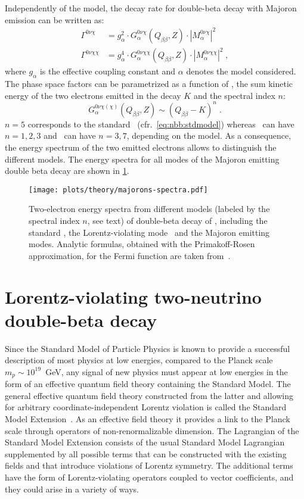 Independently of the model, the decay rate for double-beta decay with Majoron
emission can be written as:
\begin{align*}
  \Gamma^{0\nu\chi}  &= g_\alpha^2 \cdot G_\alpha^{0\nu\chi}(Q_{\beta\beta}, Z)
    \cdot |M_\alpha^{0\nu\chi}|^2 \\
  \Gamma^{0\nu\chi\chi} &= g_\alpha^4 \cdot G_\alpha^{0\nu\chi\chi}(Q_{\beta\beta}, Z)
    \cdot |M_\alpha^{0\nu\chi\chi}|^2 \;,
\end{align*}
where $g_\alpha$ is the effective coupling constant and $\alpha$ denotes the
model considered. The phase space factors can be parametrized as a
function of \qbb, the sum kinetic energy of the two electrons emitted in
the decay $K$ and the spectral index $n$:
\[
  G_\alpha^{0\nu\chi(\chi)}(Q_{\beta\beta}, Z) \sim (Q_{\beta\beta} - K)^n \;.
\]
$n = 5$ corresponds to the standard \nnbb\ (cfr.~\cref{eq:nbb:stdmodel})
whereas \onbbx\ can have $n = 1, 2, 3$ and \onbbxx\ can have $n = 3, 7$,
depending on the model. As a consequence, the energy spectrum of the two
emitted electrons allows to distinguish the different models. The energy
spectra for all modes of the Majoron emitting double beta decay are shown in
\cref{fig:nbb:majorons-spectra}.

\begin{figure}
  \centering
  \texttt{[image: plots/theory/majorons-spectra.pdf]}
  \caption{%
    Two-electron energy spectra from different models (labeled by the spectral
    index $n$, see text) of double-beta decay of \gesix, including the standard
    \nnbb, the Lorentz-violating mode \nnbblv\ and the Majoron emitting
    modes.  Analytic formulas, obtained with the Primakoff-Rosen approximation,
    for the Fermi function are taken from~\cite{Tretyak1995, Tretyak2002}.
  }\label{fig:nbb:majorons-spectra}
\end{figure}

\section{Lorentz-violating two-neutrino double-beta decay}

Since the Standard Model of Particle Physics is known to provide a successful
description of most physics at low energies, compared to the Planck scale
$m_p\sim10^{19}$~GeV, any signal of new physics must appear at low energies in
the form of an effective quantum field theory containing the Standard Model.
The general effective quantum field theory constructed from the latter and
allowing for arbitrary coordinate-independent Lorentz violation is called the
Standard Model Extension~\cite{Colladay1997, Colladay1998}. As an effective
field theory it provides a link to the Planck scale through operators of
non-renormalizable dimension. The Lagrangian of the Standard Model Extension
consists of the usual Standard Model Lagrangian supplemented by all possible
terms that can be constructed with the existing fields and that introduce
violations of Lorentz symmetry. The additional terms have the form of
Lorentz-violating operators coupled to vector coefficients, and they could
arise in a variety of ways.

